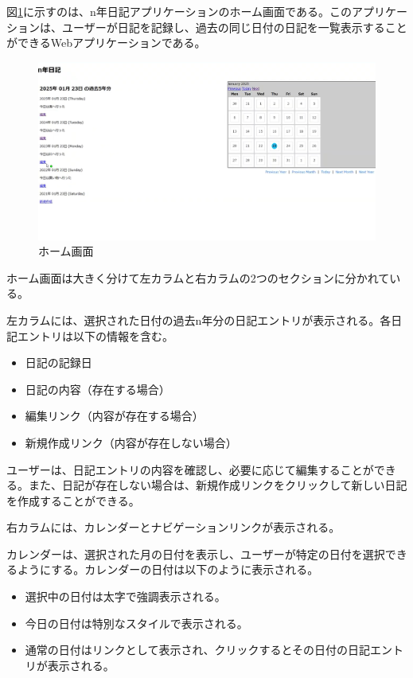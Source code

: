 \documentclass[dvipdfmx,fleqn,article]{jlreq}
\begin{document}
図\ref{fig:Home}に示すのは、n年日記アプリケーションのホーム画面である。このアプリケーションは、ユーザーが日記を記録し、過去の同じ日付の日記を一覧表示することができるWebアプリケーションである。

\begin{figure}[H]
    \centering
    \includegraphics[width=1\textwidth]{figures/Home.png}
    \caption{ホーム画面}
    \label{fig:Home}
\end{figure}

ホーム画面は大きく分けて左カラムと右カラムの2つのセクションに分かれている。

左カラムには、選択された日付の過去n年分の日記エントリが表示される。各日記エントリは以下の情報を含む。

\begin{itemize}
    \item 日記の記録日
    \item 日記の内容（存在する場合）
    \item 編集リンク（内容が存在する場合）
    \item 新規作成リンク（内容が存在しない場合）
\end{itemize}

ユーザーは、日記エントリの内容を確認し、必要に応じて編集することができる。また、日記が存在しない場合は、新規作成リンクをクリックして新しい日記を作成することができる。

右カラムには、カレンダーとナビゲーションリンクが表示される。

カレンダーは、選択された月の日付を表示し、ユーザーが特定の日付を選択できるようにする。カレンダーの日付は以下のように表示される。

\begin{itemize}
    \item 選択中の日付は太字で強調表示される。
    \item 今日の日付は特別なスタイルで表示される。
    \item 通常の日付はリンクとして表示され、クリックするとその日付の日記エントリが表示される。
\end{itemize}
\end{document}
